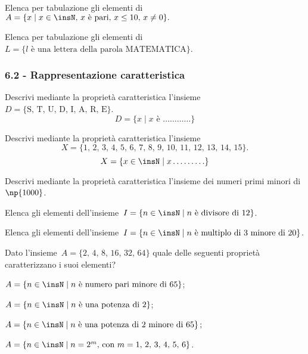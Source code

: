 \begin{esercizio}
\label{ese:6.4}
Elenca per tabulazione gli elementi di~$A=\{x\mid x\in\insN\text{, }x\text{ è pari, }x\leq10\text{, }x\neq0\}.$
\end{esercizio}

\begin{esercizio}
\label{ese:6.5}
Elenca per tabulazione gli elementi di~$L=\{l\text{ è una lettera della parola MATEMATICA}\}$.
\end{esercizio}

\subsubsection*{6.2 - Rappresentazione caratteristica}

\begin{esercizio}
\label{ese:6.6}
Descrivi mediante la proprietà caratteristica
l'insieme~$D= \{\text{S, T, U, D, I, A, R, E}\}$.
\[D=\{x\mid x\text{ è }\ldots\ldots\ldots\ldots\}\]
\end{esercizio}


\begin{esercizio}
\label{ese:6.7}
Descrivi mediante la proprietà caratteristica l'insieme
\[X=\{\text{1, 2, 3, 4, 5, 6, 7, 8, 9, 10, 11, 12, 13, 14, 15}\}.\]
\[X=\{x\in\insN\mid x\ldots\ldots\ldots\}\]
\end{esercizio}

\begin{esercizio}
\label{ese:6.8}
Descrivi mediante la proprietà caratteristica l'insieme dei numeri primi minori di~$\np{1000}$.
\end{esercizio}

\begin{esercizio}
\label{ese:6.9}
Elenca gli elementi dell'insieme~$I=\{n\in\insN\mid n\text{ è divisore di }12\}$.
\end{esercizio}

\begin{esercizio}
\label{ese:6.10}
Elenca gli elementi dell'insieme~$I=\{n\in\insN\mid n\text{ è multiplo di~3 minore di }20\}$.
\end{esercizio}
\pagebreak
\begin{esercizio}
\label{ese:6.11}
Dato l'insieme~$A=\{\text{2, 4, 8, 16, 32, 64}\}$ quale delle seguenti proprietà caratterizzano i suoi elementi?
\begin{enumeratea}
\item $A=\{n\in\insN\mid n \text{ è numero pari minore di 65}\}$;
\item $A=\{n\in\insN\mid n\text{ è una potenza di 2}\}$;
\item $A=\{n\in\insN\mid n\text{ è una potenza di~2 minore di 65}\}$;
\item $A=\{n\in\insN\mid n=2^{m}\text{, con }m=\text{1, 2, 3, 4, 5, 6}\}$.
\end{enumeratea}
\end{esercizio}

